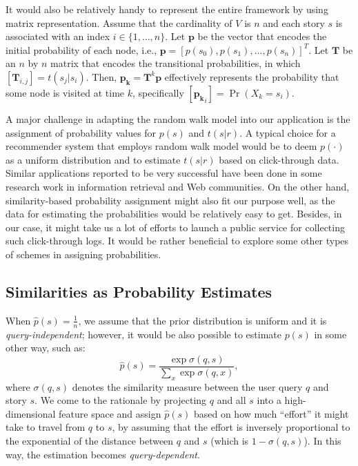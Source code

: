 \documentclass{article}[12pt]
\begin{document}
It would also be relatively handy to represent the entire framework by using
matrix representation.  Assume that the cardinality of $V$ is $n$ and each
story $s$ is associated with an index $i \in \{1, \ldots, n\}$.  Let
$\mathbf{p}$ be the vector that encodes the initial probability of each node,
i.e., $\mathbf{p} = [p(s_0), p(s_1), \ldots, p(s_n)]^T$.  Let $\mathbf{T}$ be
an $n$ by $n$ matrix that encodes the transitional probabilities, in which
$[\mathbf{T}_{i,j}] = t(s_j|s_i)$.  Then, $\mathbf{p_k} = \mathbf{T}^k
\mathbf{p}$ effectively represents the probability that some node is visited at
time $k$, specifically $[\mathbf{p_k}_{i}] = \Pr(X_k = s_i)$.

% 

A major challenge in adapting the random walk model into our application is the
assignment of probability values for $p(s)$ and $t(s|r)$.  A typical choice for
a recommender system that employs random walk model would be to deem $p(\cdot)$
as a uniform distribution and to estimate $t(s|r)$ based on click-through data.
Similar applications reported to be very successful have been done in some
research work in information retrieval and Web communities.  On the other hand,
similarity-based probability assignment might also fit our purpose well, as the
data for estimating the probabilities would be relatively easy to get.
Besides, in our case, it might take us a lot of efforts to launch a public
service for collecting such click-through logs.  It would be rather beneficial
to explore some other types of schemes in assigning probabilities.

\subsection{Similarities as Probability Estimates}\label{prob}

When $\hat{p}(s) = \frac{1}{n}$, we assume that the prior distribution is
uniform and it is \emph{query-independent}; however, it would be also possible
to estimate $p(s)$ in some other way, such as: \[\hat{p}(s) = \frac{\exp
\sigma(q,s)}{\sum_x \exp \sigma(q,x)},\] where $\sigma(q,s)$ denotes the
similarity measure between the user query $q$ and story $s$.  We come to the
rationale by projecting $q$ and all $s$ into a high-dimensional feature space
and assign $\hat{p}(s)$ based on how much ``effort'' it might take to travel
from $q$ to $s$, by assuming that the effort is inversely proportional to the
exponential of the distance between $q$ and $s$ (which is $1 - \sigma(q,s)$).
In this way, the estimation becomes \emph{query-dependent}.
\end{document}
